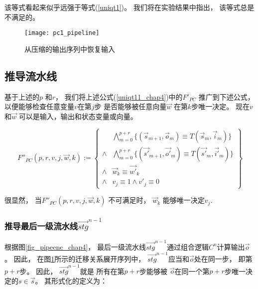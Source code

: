 该等式看起来似乎远强于等式(\ref{uniqt1})。
我们将在实验结果中指出，
该等式总是不满足的。

\begin{figure}[t]
\begin{center}
\texttt{[image: pc1\_pipeline]}
\end{center}
\caption{从压缩的输出序列中恢复输入}
  \label{fig_pc1_chap4}
\end{figure}

\subsection{推导流水线}\label{subsec_inferstage}

基于上述的$p$ 和$r$，
我们将上述公式(\ref{uniqt11_chap4})中的$F'_{PC}$ 推广到下述公式，
以便能够检查任意变量$v$在第$j$步
是否能够被任意向量$\vec{w}$ 在第$k$步唯一决定。
现在$v$ 和$\vec{w}$ 可以是输入，输出和状态变量或向量。

\begin{equation}\label{uniqt2}
F''_{PC}(p,r,v,j,\vec{w},k):=
\left\{
\begin{array}{cc}
&\bigwedge_{m=0}^{p+r}
\{
(\vec{s}_{m+1},\vec{o}_m)\equiv T(\vec{s}_m,\vec{i}_m)
\}
\\
\wedge&\bigwedge_{m=0}^{p+r}
\{
(\vec{s'}_{m+1},\vec{o'}_m)\equiv T(\vec{s'}_m,\vec{i'}_m)
\}
\\
\wedge&\vec{w}_{k}\equiv \vec{w'}_{k} \\
\wedge& v_{j}\equiv 1 \wedge  v'_{j}\equiv 0
\end{array}
\right\}
\end{equation}

很显然，
当$F''_{PC}(p,r,v,j,\vec{w},k)$ 不可满足时，
$\vec{w}_k$ 能够唯一决定$v_j$.


\subsubsection{推导最后一级流水线$\vec{stg}^{n-1}$}\label{subsub_last}
根据图\ref{fig_pipeenc_chap4}，
最后一级流水线$\vec{stg}^{n-1}$通过组合逻辑$C^n$计算输出$\vec{o}$。
因此，
在图\ref{fig_pc1_chap4}所示的迁移关系展开序列中，
$\vec{stg}^{n-1}$应当和$\vec{o}$处在同一步，
即第$p+r$步。
因此，
$\vec{stg}^{n-1}$就是
所有在第$p+r$步能够被
$\vec{o}$在同一个第$p+r$步唯一决定的$s\in \vec{s}$。
其形式化的定义为：

